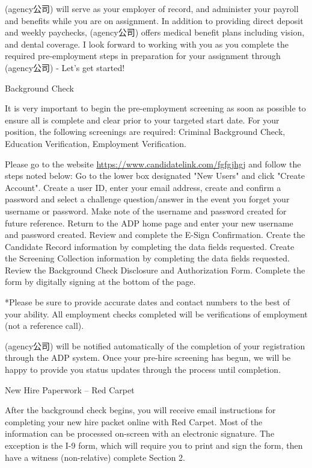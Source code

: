 \documentclass[12pt]{book}
\begin{document}
(agency公司) will serve as your employer of record, and administer your payroll and benefits while you are on assignment. In addition to providing direct deposit and weekly paychecks, (agency公司) offers medical benefit plans including vision, and dental coverage. I look forward to working with you as you complete the required pre-employment steps in preparation for your assignment through (agency公司) - Let's get started!

Background Check

It is very important to begin the pre-employment screening as soon as possible to ensure all is complete and clear prior to your targeted start date. For your position, the following screenings are required: Criminal Background Check, Education Verification, Employment Verification.

Please go to the website \url{https://www.candidatelink.com/fgfgjhgj}  and follow the steps noted below:
Go to the lower box designated "New Users" and click "Create Account".
Create a user ID, enter your email address, create and confirm a password and select a challenge question/answer in the event you forget your username or password.
Make note of the username and password created for future reference.
Return to the ADP home page and enter your new username and password created.
Review and complete the E-Sign Confirmation.
Create the Candidate Record information by completing the data fields requested.
Create the Screening Collection information by completing the data fields requested.
Review the Background Check Disclosure and Authorization Form.  Complete the form by digitally signing at the bottom of the page.

*Please be sure to provide accurate dates and contact numbers to the best of your ability. All employment checks completed will be verifications of employment (not a reference call).

(agency公司) will be notified automatically of the completion of your registration through the ADP system.  Once your pre-hire screening has begun, we will be happy to provide you status updates through the process until completion. 

New Hire Paperwork -- Red Carpet

After the background check begins, you will receive email instructions for completing your new hire packet online with Red Carpet. Most of the information can be processed on-screen with an electronic signature. The exception is the I-9 form, which will require you to print and sign the form, then have a witness (non-relative) complete Section 2.
\end{document}
